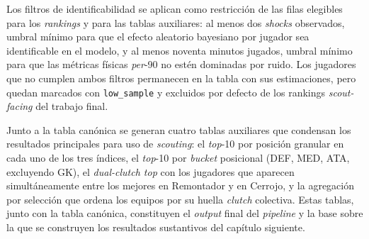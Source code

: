 Los filtros de identificabilidad se aplican como restricción de las
filas elegibles para los \textit{rankings} y para las tablas
auxiliares: al menos dos \textit{shocks} observados, umbral mínimo
para que el efecto aleatorio bayesiano por jugador sea identificable
en el modelo, y al menos noventa minutos jugados, umbral mínimo para
que las métricas físicas \textit{per}-90 no estén dominadas por
ruido. Los jugadores que no cumplen ambos filtros permanecen en la
tabla con sus estimaciones, pero quedan marcados con
\texttt{low\_sample} y excluidos por defecto de los rankings
\textit{scout-facing} del trabajo final.

Junto a la tabla canónica se generan cuatro tablas auxiliares que
condensan los resultados principales para uso de \textit{scouting}:
el \textit{top}-10 por posición granular en cada uno de los tres
índices, el \textit{top}-10 por \textit{bucket} posicional (DEF, MED,
ATA, excluyendo GK), el \textit{dual-clutch top} con los jugadores
que aparecen simultáneamente entre los mejores en Remontador y en
Cerrojo, y la agregación por selección que ordena los equipos por su
huella \textit{clutch} colectiva. Estas tablas, junto con la tabla
canónica, constituyen el \textit{output} final del \textit{pipeline}
y la base sobre la que se construyen los resultados sustantivos del
capítulo siguiente.
